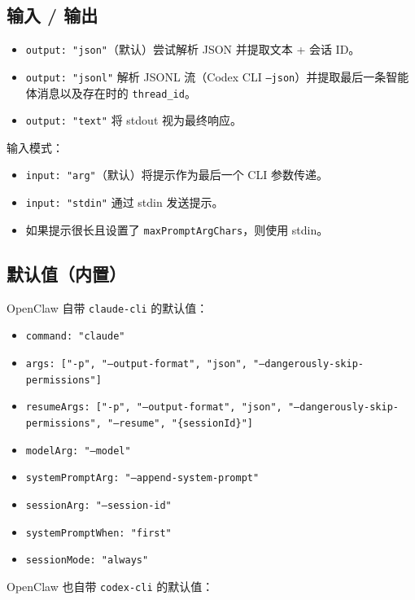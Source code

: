 \subsection{输入 / 输出}


\begin{itemize}
  \item \texttt{output: "json"}（默认）尝试解析 JSON 并提取文本 + 会话 ID。
  \item \texttt{output: "jsonl"} 解析 JSONL 流（Codex CLI \texttt{--json}）并提取最后一条智能体消息以及存在时的 \texttt{thread\_id}。
  \item \texttt{output: "text"} 将 stdout 视为最终响应。
\end{itemize}


输入模式：

\begin{itemize}
  \item \texttt{input: "arg"}（默认）将提示作为最后一个 CLI 参数传递。
  \item \texttt{input: "stdin"} 通过 stdin 发送提示。
  \item 如果提示很长且设置了 \texttt{maxPromptArgChars}，则使用 stdin。
\end{itemize}


\subsection{默认值（内置）}


OpenClaw 自带 \texttt{claude-cli} 的默认值：

\begin{itemize}
  \item \texttt{command: "claude"}
  \item \texttt{args: ["-p", "--output-format", "json", "--dangerously-skip-permissions"]}
  \item \texttt{resumeArgs: ["-p", "--output-format", "json", "--dangerously-skip-permissions", "--resume", "\{sessionId\}"]}
  \item \texttt{modelArg: "--model"}
  \item \texttt{systemPromptArg: "--append-system-prompt"}
  \item \texttt{sessionArg: "--session-id"}
  \item \texttt{systemPromptWhen: "first"}
  \item \texttt{sessionMode: "always"}
\end{itemize}


OpenClaw 也自带 \texttt{codex-cli} 的默认值：

